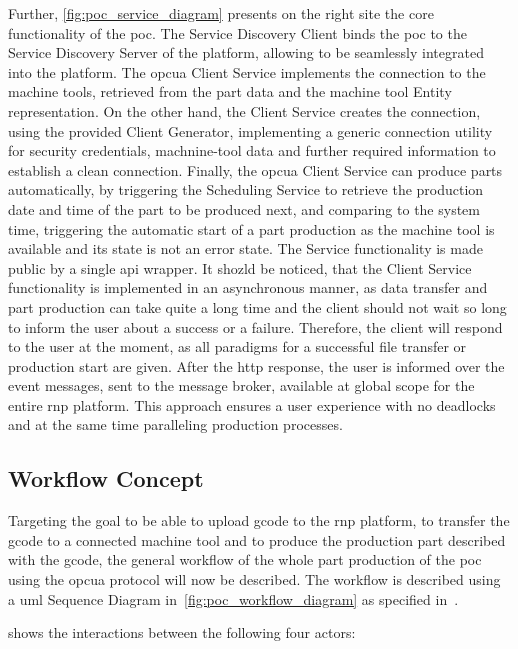 \documentclass[
a4paper,
twoside,
headsepline,
cleardoublepage=empty,
parskip=half,
draft=false
]{scrbook}
\begin{document}
				Further, \cref{fig:poc_service_diagram} presents on the right site the core functionality of the \gls{poc}.
				The Service Discovery Client binds the \gls{poc} to the Service Discovery Server of the platform, allowing to be seamlessly integrated into the platform.
				The \gls{opcua} Client Service implements the connection to the machine tools, retrieved from the part data and the machine tool Entity representation.
				On the other hand, the Client Service creates the connection, using the provided Client Generator, implementing a generic connection utility for security credentials, machnine-tool data and further required information to establish a clean connection. Finally, the \gls{opcua} Client Service can produce parts automatically, by triggering the Scheduling Service to retrieve the production date and time of the part to be produced next, and comparing to the system time, triggering the automatic start of a part production as the machine tool is available and its state is not an error state.
				The Service functionality is made public by a single \gls{api} wrapper.
				It shozld be noticed, that the Client Service functionality is implemented in an asynchronous manner, as data transfer and part production can take quite a long time and the client should not wait so long to inform the user about a success or a failure. Therefore, the client will respond to the user at the moment, as all paradigms for a successful file transfer or production start are given. After the \gls{http} response, the user is informed over the event messages, sent to the message broker, available at global scope for the entire \gls{rnp} platform. This approach ensures a user experience with no deadlocks and at the same time paralleling production processes.

			\subsection{Workflow Concept} \label{subsec:workflow_concept}

				Targeting the goal to be able to upload \gls{gcode} to the \gls{rnp} platform, to transfer the \gls{gcode} to a connected machine tool and to produce the production part described with the \gls{gcode}, the general workflow of the whole part production of the \gls{poc} using the \gls{opcua} protocol will now be described. The workflow is described using a \gls{uml} Sequence Diagram in~\cref{fig:poc_workflow_diagram} as specified in~\cite{uml2017}.
				
				 shows the interactions between the following four actors:
				
\end{document}
